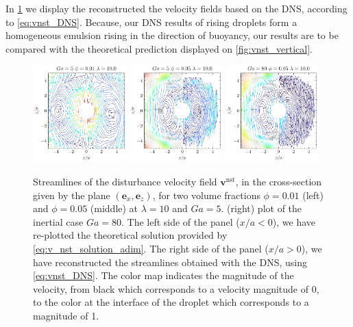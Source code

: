 In \ref{fig:vnst_DNS} we display the reconstructed the velocity fields based on the DNS, according to \ref{eq:vnst_DNS}. 
Because, our DNS results of rising droplets form a homogeneous emulsion rising in the direction of buoyancy, our results are to be compared with the theoretical prediction displayed on \ref{fig:vnst_vertical}. 
\begin{figure}
    \centering
    \includegraphics[width = 0.32\textwidth]{image/HOMOGENEOUS_final/Stream/Stream_PHI_1_Ga_5_l_10.pdf}
    \includegraphics[width = 0.32\textwidth]{image/HOMOGENEOUS_final/Stream/Stream_PHI_5_Ga_5_l_10.pdf}
    \includegraphics[width = 0.32\textwidth]{image/HOMOGENEOUS_final/Stream/Stream_PHI_5_Ga_80_l_10.pdf}
    \caption{Streamlines of the disturbance velocity field $\textbf{v}^\text{nst}$, in the cross-section given by the plane $(\textbf{e}_x,\textbf{e}_z)$, for two volume fractions $\phi = 0.01$ (left) and $\phi = 0.05$ (middle) at $\lambda = 10$ and $Ga = 5$.
    (right) plot of the inertial case $Ga = 80$. 
    The left side of the panel ($x/a < 0$), we have re-plotted the theoretical solution provided by \ref{eq:v_nst_solution_adim}.   
    The right side of the panel ($x/a > 0$), we have reconstructed the streamlines obtained with the DNS, using \ref{eq:vnst_DNS}. 
    The color map indicates the magnitude of the velocity, from black which corresponds to a velocity magnitude of 0, to the color at the interface of the droplet which corresponds to a magnitude of 1.}
    \label{fig:vnst_DNS}
\end{figure}
